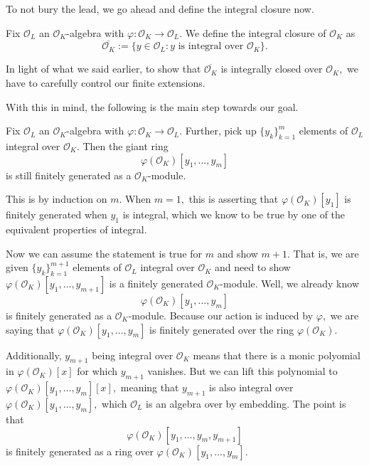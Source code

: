 To not bury the lead, we go ahead and define the integral closure now.
\begin{definition}
    Fix $\mathcal O_L$ an $\mathcal O_K$-algebra with $\varphi:\mathcal O_K\to\mathcal O_L.$ We define the integral closure of $\mathcal O_K$ as
    \[\overline{\mathcal O_K}:=\{y\in\mathcal O_L:y\text{ is integral over }\mathcal O_K\}.\]
\end{definition}
In light of what we said earlier, to show that $\overline{\mathcal O_K}$ is integrally closed over $\mathcal O_K,$ we have to carefully control our finite extensions.

With this in mind, the following is the main step towards our goal.
\begin{proposition}
    Fix $\mathcal O_L$ an $\mathcal O_K$-algebra with $\varphi:\mathcal O_K\to\mathcal O_L.$ Further, pick up $\{y_k\}_{k=1}^m$ elements of $\mathcal O_L$ integral over $\mathcal O_K.$ Then the giant ring
    \[\varphi(\mathcal O_K)[y_1,\ldots,y_m]\]
    is still finitely generated as a $\mathcal O_K$-module.
\end{proposition}
This is by induction on $m.$ When $m=1,$ this is asserting that $\varphi(\mathcal O_K)[y_1]$ is finitely generated when $y_1$ is integral, which we know to be true by one of the equivalent properties of integral.

Now we can assume the statement is true for $m$ and show $m+1.$ That is, we are given $\{y_k\}_{k=1}^{m+1}$ elements of $\mathcal O_L$ integral over $\mathcal O_K$ and need to show $\varphi(\mathcal O_K)[y_1,\ldots,y_{m+1}]$ is a finitely generated $\mathcal O_K$-module. Well, we already know
\[\varphi(\mathcal O_K)[y_1,\ldots,y_m]\]
is finitely generated as a $\mathcal O_K$-module. Because our action is induced by $\varphi,$ we are saying that $\varphi(\mathcal O_K)[y_1,\ldots,y_m]$ is finitely generated over the ring $\varphi(\mathcal O_K).$

Additionally, $y_{m+1}$ being integral over $\mathcal O_K$ means that there is a monic polyomial in $\varphi(\mathcal O_K)[x]$ for which $y_{m+1}$ vanishes. But we can lift this polynomial to $\varphi(\mathcal O_K)[y_1,\ldots,y_m][x],$ meaning that $y_{m+1}$ is also integral over $\varphi(\mathcal O_K)[y_1,\ldots,y_m],$ which $\mathcal O_L$ is an algebra over by embedding. The point is that
\[\varphi(\mathcal O_K)[y_1,\ldots,y_m,y_{m+1}]\]
is finitely generated as a ring over $\varphi(\mathcal O_K)[y_1,\ldots,y_m].$


